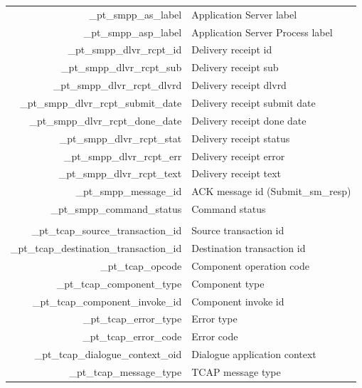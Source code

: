 \documentclass[a4paper,latin]{paper}
\begin{document}
\begin{tabularx}{\linewidth}{ | >{\ttfamily} r | >{\ttfamily} X |}
	\_pt\_smpp\_as\_label					& Application Server label \\
	\_pt\_smpp\_asp\_label					& Application Server Process label \\
	\_pt\_smpp\_dlvr\_rcpt\_id				& Delivery receipt id \\
	\_pt\_smpp\_dlvr\_rcpt\_sub				& Delivery receipt sub \\
	\_pt\_smpp\_dlvr\_rcpt\_dlvrd				& Delivery receipt dlvrd\\
	\_pt\_smpp\_dlvr\_rcpt\_submit\_date			& Delivery receipt submit date \\
	\_pt\_smpp\_dlvr\_rcpt\_done\_date			& Delivery receipt done date \\
	\_pt\_smpp\_dlvr\_rcpt\_stat				& Delivery receipt status \\
	\_pt\_smpp\_dlvr\_rcpt\_err				& Delivery receipt error \\
	\_pt\_smpp\_dlvr\_rcpt\_text				& Delivery receipt text \\
	\_pt\_smpp\_message\_id					& ACK message id (Submit\_sm\_resp) \\
	\_pt\_smpp\_command\_status				& Command status \\
	\hline
	\rowcolor{blue!10}
	\multicolumn{2}{| l |}{\acrfull{tcap}} 			\\
	\hline
	\_pt\_tcap\_source\_transaction\_id			& Source transaction id \\
	\_pt\_tcap\_destination\_transaction\_id		& Destination transaction id \\
	\_pt\_tcap\_opcode					& Component operation code \\
	\_pt\_tcap\_component\_type				& Component type \\
	\_pt\_tcap\_component\_invoke\_id			& Component invoke id \\
	\_pt\_tcap\_error\_type					& Error type \\
	\_pt\_tcap\_error\_code					& Error code \\
	\_pt\_tcap\_dialogue\_context\_oid			& Dialogue application context \\
	\_pt\_tcap\_message\_type				& TCAP message type \\
	\hline
\end{tabularx}%
\clearpage
\end{document}
